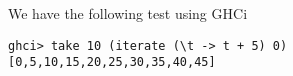 
We have the following test using GHCi
\begin{verbatim}
ghci> take 10 (iterate (\t -> t + 5) 0)
[0,5,10,15,20,25,30,35,40,45]
\end{verbatim}
